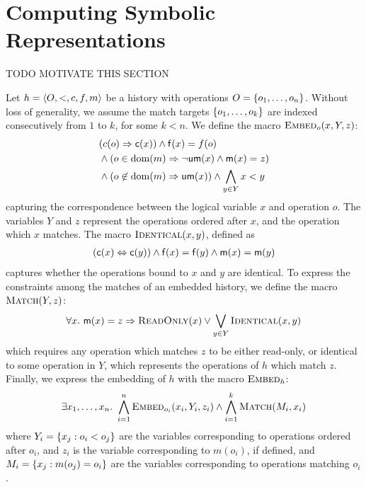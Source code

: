 \section{Computing Symbolic Representations}
\label{sec:formula}

TODO MOTIVATE THIS SECTION

Let $h = \tup{O,<,c,f,m}$ be a history with operations $O = \set{ o_1, \ldots,
o_n }$. Without loss of generality, we assume the match targets $\set{o_1,
\ldots, o_k}$ are indexed consecutively from $1$ to $k$, for some $k < n$. We
define the macro $\textsc{Embed}_o(x,Y,z)$:
\begin{align*}
  & (c(o) \implies {\sf c}(x)) \land {\sf f}(x) = f(o) \\
  & \land (o \in \dom(m) \implies \lnot{\sf um}(x) \land {\sf m}(x) = z) \\
  & \land (o \not\in \dom(m) \implies {\sf um}(x)) \land \bigwedge_{y \in Y} x < y
\end{align*}
capturing the correspondence between the logical variable $x$ and operation
$o$. The variables $Y$ and $z$ represent the operations ordered after $x$, and
the operation which $x$ matches. The macro $\textsc{Identical}(x,y)$, defined as
\begin{align*}
  ({\sf c}(x) \Leftrightarrow {\sf c}(y))
  \land {\sf f}(x) = {\sf f}(y)
  \land {\sf m}(x) = {\sf m}(y)
\end{align*}
captures whether the operations bound to $x$ and $y$ are identical.
To express the constraints among the matches of an embedded history, we define
the macro $\textsc{Match}(Y,z)$:
\begin{align*}
  \forall x.\ {\sf m}(x) = z \implies
  \textsc{ReadOnly}(x) \lor \bigvee_{y \in Y} \textsc{Identical}(x,y)
\end{align*}
which requires any operation which matches $z$ to be either read-only, or
identical to some operation in $Y$, which represents the operations of $h$
which match $z$. Finally, we express the embedding of $h$ with the macro
$\textsc{Embed}_h$:
\begin{align*}
  \exists x_1, \ldots, x_n.\ \bigwedge_{i=1}^{n} \textsc{Embed}_{o_i}(x_i,Y_i,z_i)
  \land \bigwedge_{i=1}^{k} \textsc{Match}(M_i, x_i)
\end{align*}
where $Y_i = \set{ x_j : o_i < o_j }$ are the variables corresponding to
operations ordered after $o_i$, and $z_i$ is the variable corresponding to
$m(o_i)$, if defined, and $M_i = \set{ x_j : m(o_j) = o_i }$ are the variables
corresponding to operations matching $o_i$.

